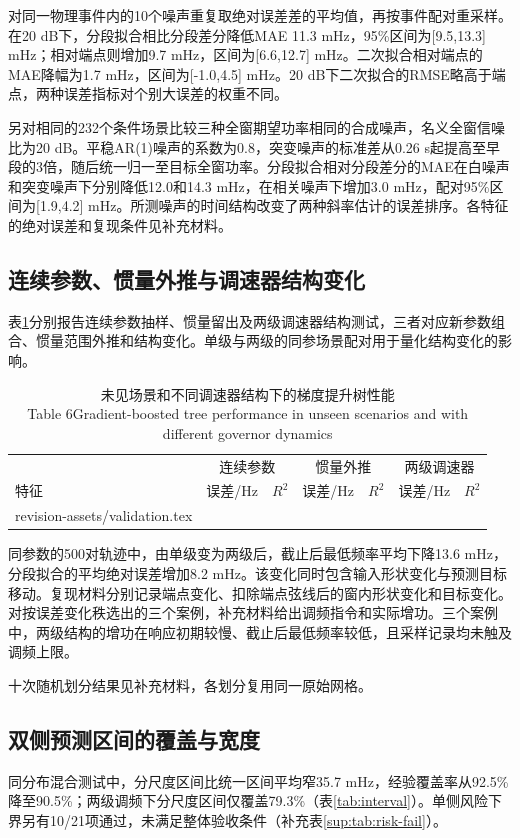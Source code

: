 \documentclass[UTF8,a4paper,11pt]{ctexart}
\makeatletter
\newcommand{\resultrows}[1]{\@@input #1 }
\makeatother
\begin{document}
对同一物理事件内的10个噪声重复取绝对误差差的平均值，再按事件配对重采样。在20 dB下，分段拟合相比分段差分降低MAE 11.3 mHz，95\%区间为[9.5,13.3] mHz；相对端点则增加9.7 mHz，区间为[6.6,12.7] mHz。二次拟合相对端点的MAE降幅为1.7 mHz，区间为[-1.0,4.5] mHz。20 dB下二次拟合的RMSE略高于端点，两种误差指标对个别大误差的权重不同。

另对相同的232个条件场景比较三种全窗期望功率相同的合成噪声，名义全窗信噪比为20 dB。平稳AR(1)噪声的系数为0.8，突变噪声的标准差从0.26 s起提高至早段的3倍，随后统一归一至目标全窗功率。分段拟合相对分段差分的MAE在白噪声和突变噪声下分别降低12.0和14.3 mHz，在相关噪声下增加3.0 mHz，配对95\%区间为[1.9,4.2] mHz。所测噪声的时间结构改变了两种斜率估计的误差排序。各特征的绝对误差和复现条件见补充材料。

\subsection{连续参数、惯量外推与调速器结构变化}
表\ref{tab:general}分别报告连续参数抽样、惯量留出及两级调速器结构测试，三者对应新参数组合、惯量范围外推和结构变化。单级与两级的同参场景配对用于量化结构变化的影响。

\begin{table}[!htbp]
\centering\small
\caption{未见场景和不同调速器结构下的梯度提升树性能\\Table 6\quad Gradient-boosted tree performance in unseen scenarios and with different governor dynamics}
\label{tab:general}
\begin{tabular}{lrrrrrr}
\toprule
 & \multicolumn{2}{c}{连续参数} & \multicolumn{2}{c}{惯量外推} & \multicolumn{2}{c}{两级调速器}\\
特征 & 误差/Hz & $R^2$ & 误差/Hz & $R^2$ & 误差/Hz & $R^2$\\
\midrule
\resultrows{revision-assets/validation.tex}
\bottomrule
\end{tabular}
\end{table}

同参数的500对轨迹中，由单级变为两级后，截止后最低频率平均下降13.6 mHz，分段拟合的平均绝对误差增加8.2 mHz。该变化同时包含输入形状变化与预测目标移动。复现材料分别记录端点变化、扣除端点弦线后的窗内形状变化和目标变化。对按误差变化秩选出的三个案例，补充材料给出调频指令和实际增功。三个案例中，两级结构的增功在响应初期较慢、截止后最低频率较低，且采样记录均未触及调频上限。

十次随机划分结果见补充材料，各划分复用同一原始网格。

\subsection{双侧预测区间的覆盖与宽度}
同分布混合测试中，分尺度区间比统一区间平均窄35.7 mHz，经验覆盖率从92.5\%降至90.5\%；两级调频下分尺度区间仅覆盖79.3\%（表\ref{tab:interval}）。单侧风险下界另有10/21项通过，未满足整体验收条件（补充表\ref{sup:tab:risk-fail}）。
\end{document}
